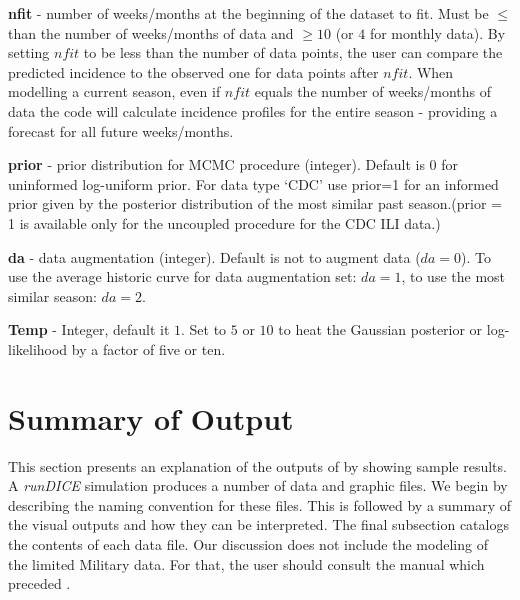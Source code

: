 \documentclass[a4paper]{article}
\begin{document}

  \textbf{nfit} - number of weeks/months at the beginning of the dataset to fit.  Must be $\leq$ than the number of weeks/months of data and $\geq 10$ (or $4$ for monthly data).  By setting $nfit$ to be less than the number of data points, the user can compare the predicted incidence to the observed one for data points after $nfit$. When modelling a  current season, even if $nfit$ equals the number of weeks/months of data the code will calculate incidence profiles for the entire season - providing a forecast for all future weeks/months.

\textbf{prior} - prior distribution for MCMC procedure (integer). Default is $0$ for uninformed log-uniform prior.  For data type `CDC' use prior=1 for an informed prior given by the posterior distribution of the most similar past season.(prior = 1 is available only for the uncoupled procedure for the CDC ILI data.)

\textbf{da} - data augmentation (integer). Default is not to augment data ($da = 0$). To use the average historic curve for data augmentation set: $da = 1$, to use the most similar season: $da = 2$.

\textbf{Temp} - Integer, default it $1$.  Set to $5$ or $10$ to heat the Gaussian posterior or log-likelihood by a factor of five or ten.

%


\section{Summary of  Output}
\label{sec:output}
This section presents an explanation of the outputs of  by showing sample results.  A \textit{runDICE} simulation produces a number of data and graphic files.  We begin by describing the naming convention for these files.  This is followed by a summary of the visual outputs and how they can be interpreted.  The final subsection catalogs the contents of each data file. Our discussion does not include the modeling of the limited Military data.  For that, the user should consult the  manual which preceded .
\end{document}
